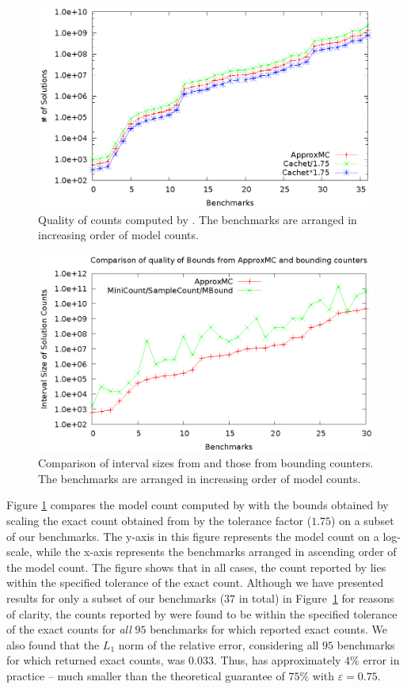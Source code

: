 \begin{figure}[h!b]\centering
\includegraphics[scale=0.7]{quality.eps}
\caption{Quality of counts computed by {\approxMC}. The benchmarks are
  arranged in increasing order of model counts.}
\label{fig:quality_comparison}
\end{figure}
\begin{figure}[h!b]
\centering
\includegraphics[scale=0.7]{bounding.eps}
\caption{Comparison of interval sizes from {\approxMC} and those from
  bounding counters. The benchmarks are arranged in increasing order
  of model counts.}
\label{fig:bounding_comparisons}
\end{figure}
Figure \ref{fig:quality_comparison} compares the model count computed
by {\ApproxMC} with the bounds obtained by scaling the exact count
obtained from {\Cachet} by the tolerance factor ($1.75$) on
a subset of our benchmarks. The y-axis in this figure represents the
model count on a log-scale, while the x-axis represents the
benchmarks arranged in ascending order of the model count.
%
%
%
%
The figure shows that in all cases, the count reported by {\ApproxMC}
lies within the specified tolerance of the exact count.  Although we
have presented results for only a subset of our benchmarks ($37$
in total) in Figure~\ref{fig:quality_comparison} for reasons of
clarity, the counts reported by {\ApproxMC} were found to be within
the specified tolerance of the exact counts for \emph{all} $95$
benchmarks for which {\Cachet} reported exact counts.  %
%
%
We also found that the $L_1$ norm of the relative
error, considering all $95$ benchmarks for which {\Cachet} returned
exact counts, was $0.033$.  Thus, {\ApproxMC} has approximately $4\%$
error in practice -- much smaller than the theoretical guarantee of
$75\%$ with $\varepsilon = 0.75$.
  
